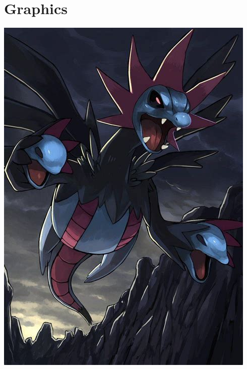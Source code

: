 \documentclass{article}
\begin{document}
\section*{Graphics}

\includegraphics[scale=0.25]{img1}
\end{document}
